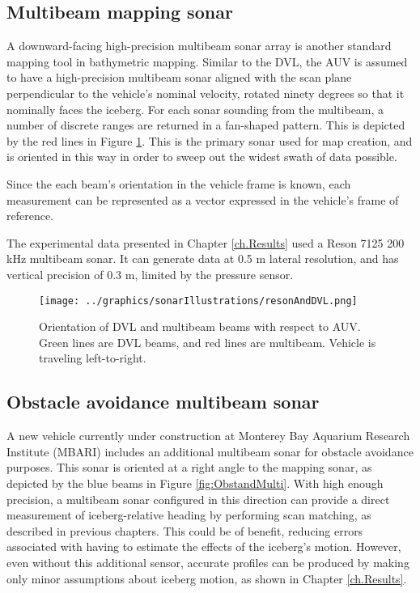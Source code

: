 \subsection{Multibeam mapping sonar}

A downward-facing high-precision multibeam sonar array is another standard mapping tool in bathymetric mapping. Similar to the DVL, the AUV is assumed to have a high-precision multibeam sonar aligned with the scan plane perpendicular to the vehicle's nominal velocity, rotated ninety degrees so that it nominally faces the iceberg. For each sonar sounding from the multibeam, a number of discrete ranges are returned in a fan-shaped pattern. This is depicted by the red lines in Figure \ref{fig:DVLandMulti}. This is the primary sonar used for map creation, and is oriented in this way in order to sweep out the widest swath of data possible. 

Since the each beam's orientation in the vehicle frame is known, each measurement can be represented as a vector expressed in the vehicle's frame of reference.

The experimental data presented in Chapter \ref{ch.Results} used a Reson 7125 200 kHz multibeam sonar. It can generate data at 0.5 m lateral resolution, and has vertical precision of 0.3 m, limited by the pressure sensor.

\begin{figure}[htb]
   \centering
   \texttt{[image: ../graphics/sonarIllustrations/resonAndDVL.png]} %
   \caption{Orientation of DVL and multibeam beams with respect to AUV. Green lines are DVL beams, and red lines are multibeam. Vehicle is traveling left-to-right.}
   \label{fig:DVLandMulti}
\end{figure}

\subsection{Obstacle avoidance multibeam sonar}

A new vehicle currently under construction at Monterey Bay Aquarium Research Institute (MBARI) includes an additional multibeam sonar for obstacle avoidance purposes. This sonar is oriented at a right angle to the mapping sonar, as depicted by the blue beams in Figure \ref{fig:ObstandMulti}. With high enough precision, a multibeam sonar configured in this direction can provide a direct measurement of iceberg-relative heading by performing scan matching, as described in previous chapters. This could be of benefit, reducing errors associated with having to estimate the effects of the iceberg's motion. However, even without this additional sensor, accurate profiles can be produced by making only minor assumptions about iceberg motion, as shown in Chapter \ref{ch.Results}.

